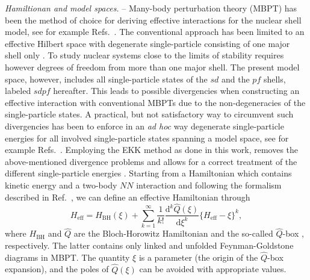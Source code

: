 \documentclass[aps,prl,twocolumn,groupedaddress,showkeys,showpacs,floatfix,superscriptaddress]{revtex4-1}
\newcommand\Heff{H_{\mathrm{eff}}}
\newcommand\HBH{H_{\mathrm{BH}}}
\newcommand\+{^\dagger}
\newcommand\diff{\mathrm{d}}
\newcommand\Qbox{$\hat{Q}$-box }
\begin{document}
{\it Hamiltionan and model spaces.} -- 
Many-body perturbation theory (MBPT) has been the
method of choice for deriving effective interactions for the nuclear shell model, see for example
Refs.~\cite{Kuo:1971em,Krenciglowa1974171, Krenciglowa1977381,Kuo_springer,HjorthJensen1995125}.  
The conventional approach \cite{Kuo:1971em,Krenciglowa1974171, Krenciglowa1977381,HjorthJensen1995125} has been limited to  
an effective Hilbert space with degenerate single-particle consisting of  one major shell only \cite{Kuo:1971em,Krenciglowa1974171, Krenciglowa1977381,Kuo_springer,HjorthJensen1995125}.   To study nuclear systems close to the limits of stability requires however degrees of freedom from more than one major shell.
The present model space, however, includes all single-particle states of the
$sd$ and the $pf$ shells, labeled $sdpf$ hereafter.  
This leads to possible divergencies when
constructing an effective interaction with conventional MBPTs due to the non-degeneracies of the 
single-particle states.
A practical, but not satisfactory way to
circumvent such divergencies has been to enforce in an {\em ad hoc} way degenerate
single-particle energies for all involved single-particle
states spanning a model space, see for example
Refs.~\cite{Holt:2012gc,Holt:2013en,Holt:2014uc}.  
Employing the EKK method as done in this work, removes the
above-mentioned divergence problems and allows for a correct treatment of
the different single-particle energies \cite{Tsunoda:2014hj}.
Starting from a Hamiltonian which contains kinetic energy and a two-body $NN$ interaction and
following the formalism described in Ref.~\cite{Tsunoda:2014hj}, we can define  an effective Hamiltonian through
\begin{equation}\label{eq:EKK}
\Heff=\HBH(\xi)+
 \sum_{k=1}^{\infty}\frac{1}{k!}\frac{\diff^k \hat{Q}(\xi)}{\diff \xi^k}\{\Heff -\xi\}^k, 
\end{equation}
where $\HBH$ and $\hat{Q}$ are the Bloch-Horowitz Hamiltonian and the so-called \Qbox \cite{Kuo_springer,HjorthJensen1995125}, respectively. 
The latter contains only linked and unfolded  
Feynman-Goldstone diagrams in MBPT.
The quantity $\xi$ is a parameter (the origin of the \Qbox expansion), and the poles of $\hat{Q}(\xi)$ can be
avoided with appropriate values. 
\end{document}

